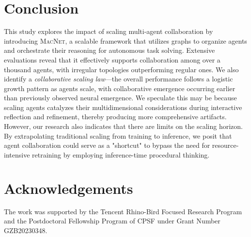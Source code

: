 \documentclass{article}
\begin{document}
\section{Conclusion}
This study explores the impact of scaling multi-agent collaboration by introducing \textsc{MacNet}, a scalable framework that utilizes graphs to organize agents and orchestrate their reasoning for autonomous task solving.
Extensive evaluations reveal that it effectively supports collaboration among over a thousand agents, with irregular topologies outperforming regular ones.
We also identify a \textit{collaborative scaling law}—the overall performance follows a logistic growth pattern as agents scale, with collaborative emergence occurring earlier than previously observed neural emergence.
We speculate this may be because scaling agents catalyzes their multidimensional considerations during interactive reflection and refinement, thereby producing more comprehensive artifacts.
However, our research also indicates that there are limits on the scaling horizon. By extrapolating traditional scaling from training to inference, we posit that agent collaboration could serve as a "shortcut" to bypass the need for resource-intensive retraining by employing inference-time procedural thinking.

\section*{Acknowledgements}
The work was supported by the Tencent Rhino-Bird Focused Research Program and the Postdoctoral Fellowship Program of CPSF under Grant Number GZB20230348.



\end{document}
